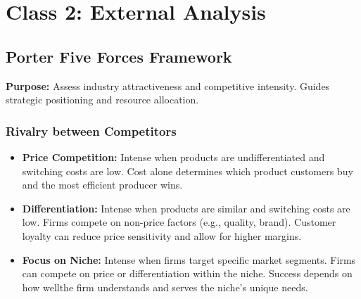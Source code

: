 \section{Class 2: External Analysis}
\subsection{Porter Five Forces Framework}
\textbf{Purpose:} Assess industry attractiveness and competitive intensity. Guides
strategic positioning and resource allocation.
\begin{center}
\end{center}

\subsubsection{Rivalry between Competitors}
\begin{itemize}
    \item \textbf{Price Competition:} Intense when products are undifferentiated and switching
          costs are low. Cost alone determines which product customers buy and the most
          efficient producer wins.
    \item \textbf{Differentiation:} Intense when products are similar and switching costs are
          low. Firms compete on non-price factors (e.g., quality, brand). Customer
          loyalty can reduce price sensitivity and allow for higher margins.
    \item \textbf{Focus on Niche:} Intense when firms target specific market segments. Firms can
          compete on price or differentiation within the niche. Success depends on how
          wellthe firm understands and serves the niche's unique needs.
\end{itemize}

